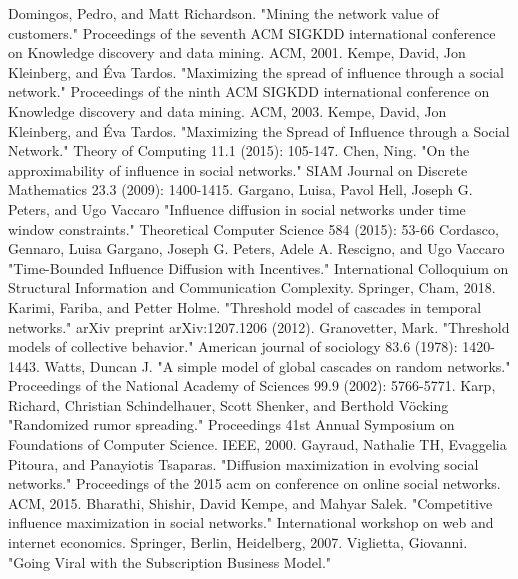 \documentclass[twocolumn, 10pt]{article}
\begin{document}
\newpage

\begin{thebibliography}{1}

 Domingos, Pedro, and Matt Richardson. "Mining the network value of customers." Proceedings of the seventh ACM SIGKDD international conference on Knowledge discovery and data mining. ACM, 2001.
 Kempe, David, Jon Kleinberg, and Éva Tardos. "Maximizing the spread of influence through a social network." Proceedings of the ninth ACM SIGKDD international conference on Knowledge discovery and data mining. ACM, 2003.
 Kempe, David, Jon Kleinberg, and Éva Tardos. "Maximizing the Spread of Influence through a Social Network." Theory of Computing 11.1 (2015): 105-147.
 Chen, Ning. "On the approximability of influence in social networks." SIAM Journal on Discrete Mathematics 23.3 (2009): 1400-1415.
 Gargano, Luisa, Pavol Hell, Joseph G. Peters, and Ugo Vaccaro "Influence diffusion in social networks under time window constraints." Theoretical Computer Science 584 (2015): 53-66
 Cordasco, Gennaro,  Luisa Gargano, Joseph G. Peters, Adele A. Rescigno, and Ugo Vaccaro "Time-Bounded Influence Diffusion with Incentives." International Colloquium on Structural Information and Communication Complexity. Springer, Cham, 2018.
 Karimi, Fariba, and Petter Holme. "Threshold model of cascades in temporal networks." arXiv preprint arXiv:1207.1206 (2012).
 Granovetter, Mark. "Threshold models of collective behavior." American journal of sociology 83.6 (1978): 1420-1443.
 Watts, Duncan J. "A simple model of global cascades on random networks." Proceedings of the National Academy of Sciences 99.9 (2002): 5766-5771.
 Karp, Richard, Christian Schindelhauer, Scott Shenker, and Berthold V\"ocking "Randomized rumor spreading." Proceedings 41st Annual Symposium on Foundations of Computer Science. IEEE, 2000.
 Gayraud, Nathalie TH, Evaggelia Pitoura, and Panayiotis Tsaparas. "Diffusion maximization in evolving social networks." Proceedings of the 2015 acm on conference on online social networks. ACM, 2015.
 Bharathi, Shishir, David Kempe, and Mahyar Salek. "Competitive influence maximization in social networks." International workshop on web and internet economics. Springer, Berlin, Heidelberg, 2007.
 Viglietta, Giovanni. "Going Viral with the Subscription Business Model."

\end{thebibliography}
\end{document}
